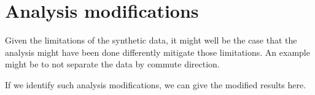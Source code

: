 \section{Analysis modifications}

Given the limitations of the synthetic data, it might well be the case that the analysis might have been done differently mitigate those limitations. An example might be to not separate the data by commute direction.

If we identify such analysis modifications, we can give the modified results here.



